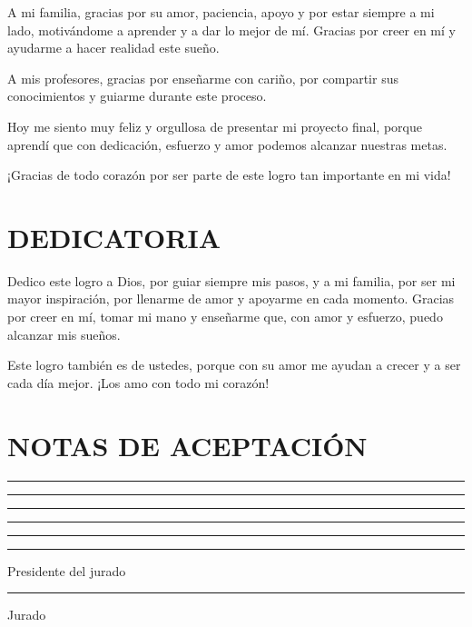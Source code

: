 \documentclass[12pt,letterpaper]{article}
\begin{document}
A mi familia, gracias por su amor, paciencia, apoyo y por estar siempre a mi lado, motivándome a aprender y a dar lo mejor de mí. Gracias por creer en mí y ayudarme a hacer realidad este sueño.

A mis profesores, gracias por enseñarme con cariño, por compartir sus conocimientos y guiarme durante este proceso.

Hoy me siento muy feliz y orgullosa de presentar mi proyecto final, porque aprendí que con dedicación, esfuerzo y amor podemos alcanzar nuestras metas.

¡Gracias de todo corazón por ser parte de este logro tan importante en mi vida!

\section{DEDICATORIA}
Dedico este logro a Dios, por guiar siempre mis pasos, y a mi familia, por ser mi mayor inspiración, por llenarme de amor y apoyarme en cada momento. Gracias por creer en mí, tomar mi mano y enseñarme que, con amor y esfuerzo, puedo alcanzar mis sueños.

Este logro también es de ustedes, porque con su amor me ayudan a crecer y a ser cada día mejor. ¡Los amo con todo mi corazón!

\section{NOTAS DE ACEPTACIÓN}
\singlespacing
\vspace{1cm}
\noindent\rule{\textwidth}{0.4pt}\par\vspace{1.2em}
\noindent\rule{\textwidth}{0.4pt}\par\vspace{1.2em}
\noindent\rule{\textwidth}{0.4pt}\par\vspace{1.2em}
\noindent\rule{\textwidth}{0.4pt}\par\vspace{1.2em}
\noindent\rule{\textwidth}{0.4pt}\par\vspace{3cm}

\noindent\rule{8cm}{0.4pt}\par
\noindent Presidente del jurado\par\vspace{2cm}

\noindent\rule{8cm}{0.4pt}\par
\noindent Jurado\par\vspace{2cm}
\end{document}
